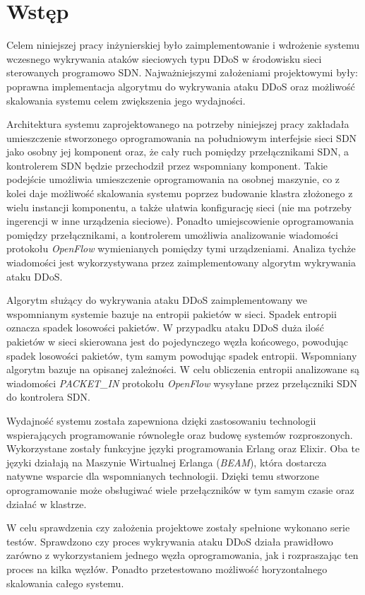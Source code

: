 \chapter{Wstęp}

Celem niniejszej pracy inżynierskiej było zaimplementowanie i wdrożenie systemu
wczesnego wykrywania ataków sieciowych typu DDoS w środowisku sieci sterowanych
programowo SDN. Najważniejszymi założeniami projektowymi były: poprawna
implementacja algorytmu do wykrywania ataku DDoS oraz możliwość skalowania
systemu celem zwiększenia jego wydajności.

Architektura systemu zaprojektowanego na potrzeby niniejszej pracy zakładała
umieszczenie stworzonego oprogramowania na południowym interfejsie sieci SDN
jako osobny jej komponent oraz, że cały ruch pomiędzy przełącznikami SDN, a
kontrolerem SDN będzie przechodził przez wspomniany komponent. Takie podejście
umożliwia umieszczenie oprogramowania na osobnej maszynie, co z kolei daje
możliwość skalowania systemu poprzez budowanie klastra złożonego z wielu
instancji komponentu, a także ułatwia konfigurację sieci (nie ma potrzeby
ingerencji w inne urządzenia sieciowe). Ponadto umiejscowienie oprogramowania
pomiędzy przełącznikami, a kontrolerem umożliwia analizowanie wiadomości
protokołu \textit{OpenFlow} wymienianych pomiędzy tymi urządzeniami. Analiza
tychże wiadomości jest wykorzystywana przez zaimplementowany algorytm wykrywania
ataku DDoS.

Algorytm służący do wykrywania ataku DDoS zaimplementowany we wspomnianym
systemie bazuje na entropii pakietów w sieci. Spadek entropii oznacza spadek
losowości pakietów. W przypadku ataku DDoS duża ilość pakietów w sieci
skierowana jest do pojedynczego węzła końcowego, powodując spadek losowości
pakietów, tym samym powodując spadek entropii. Wspomniany algorytm bazuje na
opisanej zależności. W celu obliczenia entropii analizowane są wiadomości
\textit{PACKET\_IN} protokołu \textit{OpenFlow} wysyłane przez przełączniki SDN
do kontrolera SDN.

Wydajność systemu została zapewniona dzięki zastosowaniu technologii
wspierających programowanie równoległe oraz budowę systemów rozproszonych.
Wykorzystane zostały funkcyjne języki programowania Erlang oraz Elixir. Oba te
języki działają na Maszynie Wirtualnej Erlanga (\textit{BEAM}), która dostarcza
natywne wsparcie dla wspomnianych technologii. Dzięki temu stworzone
oprogramowanie może obsługiwać wiele przełączników w tym samym czasie oraz
działać w klastrze.

W celu sprawdzenia czy założenia projektowe zostały spełnione wykonano serie
testów. Sprawdzono czy proces wykrywania ataku DDoS działa prawidłowo zarówno z
wykorzystaniem jednego węzła oprogramowania, jak i rozpraszając ten proces na
kilka węzłów. Ponadto przetestowano możliwość horyzontalnego skalowania całego
systemu.
